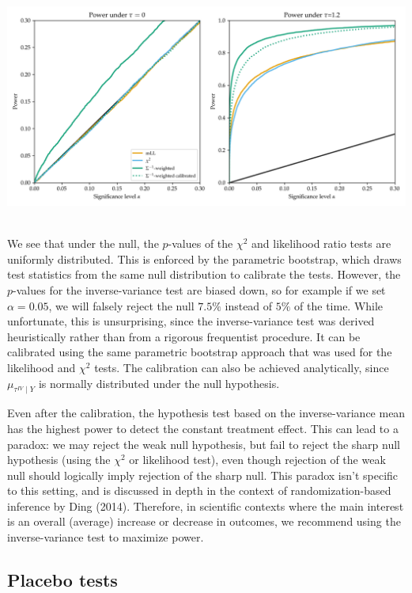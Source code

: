 \documentclass[letter]{article}
\makeatletter
\def\maxwidth{\ifdim\Gin@nat@width>\linewidth\linewidth
    \else\Gin@nat@width\fi}
\let\Oldincludegraphics\includegraphics
\renewcommand{\includegraphics}[1]{\Oldincludegraphics[width=.8\maxwidth]{#1}}
\newcommand{\invvar}{\tau^{IV}}
\makeatother
\begin{document}
\includegraphics{figures/power_HT.png} \(\label{fig:power}\)

We see that under the null, the \(p\)-values of the \(\chi^2\) and
likelihood ratio tests are uniformly distributed. This is enforced by
the parametric bootstrap, which draws test statistics from the same null
distribution to calibrate the tests. However, the \(p\)-values for the
inverse-variance test are biased down, so for example if we set
\(\alpha=0.05\), we will falsely reject the null \(7.5\%\) instead of
\(5\%\) of the time. While unfortunate, this is unsurprising, since the
inverse-variance test was derived heuristically rather than from a
rigorous frequentist procedure. It can be calibrated using the same
parametric bootstrap approach that was used for the likelihood and
\(\chi^2\) tests. The calibration can also be achieved analytically,
since \(\mu_{\invvar \mid Y}\) is normally distributed under the null
hypothesis.

Even after the calibration, the hypothesis test based on the
inverse-variance mean has the highest power to detect the constant
treatment effect. This can lead to a paradox: we may reject the weak
null hypothesis, but fail to reject the sharp null hypothesis (using the
\(\chi^2\) or likelihood test), even though rejection of the weak null
should logically imply rejection of the sharp null. This paradox isn't
specific to this setting, and is discussed in depth in the context of
randomization-based inference by Ding (2014). Therefore, in scientific
contexts where the main interest is an overall (average) increase or
decrease in outcomes, we recommend using the inverse-variance test to
maximize power.
    


    	\subsection{Placebo tests}\label{placebo-tests}
\end{document}
